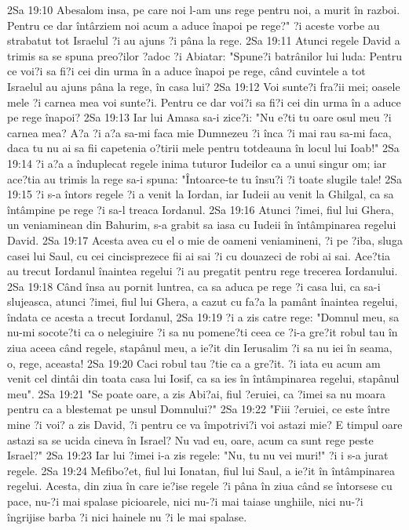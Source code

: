 2Sa 19:10  Abesalom insa, pe care noi l-am uns rege pentru noi, a murit în razboi. Pentru ce dar întârziem noi acum a aduce înapoi pe rege?" ?i aceste vorbe au strabatut tot Israelul ?i au ajuns ?i pâna la rege.
2Sa 19:11  Atunci regele David a trimis sa se spuna preo?ilor ?adoc ?i Abiatar: "Spune?i batrânilor lui luda: Pentru ce voi?i sa fi?i cei din urma în a aduce înapoi pe rege, când cuvintele a tot Israelul au ajuns pâna la rege, în casa lui?
2Sa 19:12  Voi sunte?i fra?ii mei; oasele mele ?i carnea mea voi sunte?i. Pentru ce dar voi?i sa fi?i cei din urma în a aduce pe rege înapoi?
2Sa 19:13  Iar lui Amasa sa-i zice?i: "Nu e?ti tu oare osul meu ?i carnea mea? A?a ?i a?a sa-mi faca mie Dumnezeu ?i înca ?i mai rau sa-mi faca, daca tu nu ai sa fii capetenia o?tirii mele pentru totdeauna în locul lui Ioab!"
2Sa 19:14  ?i a?a a înduplecat regele inima tuturor Iudeilor ca a unui singur om; iar ace?tia au trimis la rege sa-i spuna: "Întoarce-te tu însu?i ?i toate slugile tale!
2Sa 19:15  ?i s-a întors regele ?i a venit la Iordan, iar Iudeii au venit la Ghilgal, ca sa întâmpine pe rege ?i sa-l treaca Iordanul.
2Sa 19:16  Atunci ?imei, fiul lui Ghera, un veniaminean din Bahurim, s-a grabit sa iasa cu Iudeii în întâmpinarea regelui David.
2Sa 19:17  Acesta avea cu el o mie de oameni veniamineni, ?i pe ?iba, sluga casei lui Saul, cu cei cincisprezece fii ai sai ?i cu douazeci de robi ai sai. Ace?tia au trecut Iordanul înaintea regelui ?i au pregatit pentru rege trecerea Iordanului.
2Sa 19:18  Când însa au pornit luntrea, ca sa aduca pe rege ?i casa lui, ca sa-i slujeasca, atunci ?imei, fiul lui Ghera, a cazut cu fa?a la pamânt înaintea regelui, îndata ce acesta a trecut Iordanul,
2Sa 19:19  ?i a zis catre rege: "Domnul meu, sa nu-mi socote?ti ca o nelegiuire ?i sa nu pomene?ti ceea ce ?i-a gre?it robul tau în ziua aceea când regele, stapânul meu, a ie?it din Ierusalim ?i sa nu iei în seama, o, rege, aceasta!
2Sa 19:20  Caci robul tau ?tie ca a gre?it. ?i iata eu acum am venit cel dintâi din toata casa lui Iosif, ca sa ies în întâmpinarea regelui, stapânul meu".
2Sa 19:21  "Se poate oare, a zis Abi?ai, fiul ?eruiei, ca ?imei sa nu moara pentru ca a blestemat pe unsul Domnului?"
2Sa 19:22  "Fiii ?eruiei, ce este între mine ?i voi? a zis David, ?i pentru ce va împotrivi?i voi astazi mie? E timpul oare astazi sa se ucida cineva în Israel? Nu vad eu, oare, acum ca sunt rege peste Israel?"
2Sa 19:23  Iar lui ?imei i-a zis regele: "Nu, tu nu vei muri!" ?i i s-a jurat regele.
2Sa 19:24  Mefibo?et, fiul lui Ionatan, fiul lui Saul, a ie?it în întâmpinarea regelui. Acesta, din ziua în care ie?ise regele ?i pâna în ziua când se întorsese cu pace, nu-?i mai spalase picioarele, nici nu-?i mai taiase unghiile, nici nu-?i îngrijise barba ?i nici hainele nu ?i le mai spalase.

